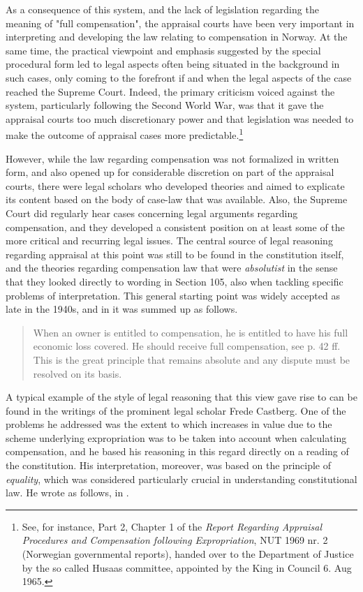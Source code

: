 \documentclass[10pt]{article} %
\begin{document}
As a consequence of this system, and the lack of legislation regarding the meaning of "full compensation", the appraisal courts have been very important in interpreting and developing the law relating to compensation in Norway. At the same time, the practical viewpoint and emphasis suggested by the special procedural form led to legal aspects often being situated in the background in such cases, only coming to the forefront if and when the legal aspects of the case reached the Supreme Court. Indeed, the primary criticism voiced against the system, particularly following the Second World War, was that it gave the appraisal courts too much discretionary power and that legislation was needed to make the outcome of appraisal cases more predictable.\footnote{See, for instance, Part 2, Chapter 1 of the \emph{Report Regarding Appraisal Procedures and Compensation following Expropriation}, NUT 1969 nr. 2 (Norwegian governmental reports), handed over to the Department of Justice by the so called Husaas committee, appointed by the King in Council 6. Aug 1965.}

However, while the law regarding compensation was not formalized in written form, and also opened up for considerable discretion on part of the appraisal courts, there were legal scholars who developed theories and aimed to explicate its content based on the body of case-law that was available. Also, the Supreme Court did regularly hear cases concerning legal arguments regarding compensation, and they developed a consistent position on at least some of the more critical and recurring legal issues. The central source of legal reasoning regarding appraisal at this point was still to be found in the constitution itself, and the theories regarding compensation law that were \emph{absolutist} in the sense that they looked directly to wording in Section 105, also when tackling specific problems of interpretation. This general starting point was widely accepted as late in the 1940s, and in \cite[p. 177]{schj} it was summed up as follows.

\begin{quote}
When an owner is entitled to compensation, he is entitled to have his full economic loss covered. He should receive full compensation, see p. 42 ff. This is the great principle that remains absolute and any dispute must be resolved on its basis.
\end{quote}

A typical example of the style of legal reasoning that this view gave rise to can be found in the writings of the prominent legal scholar Frede Castberg. One of the problems he addressed was the extent to which increases in value due to the scheme underlying expropriation was to be taken into account when calculating compensation, and he based his reasoning in this regard directly on a reading of the constitution. His interpretation, moreover, was based on the principle of \emph{equality}, which was considered particularly crucial in understanding constitutional law. He wrote as follows, in \cite[Volume 2, p. 268]{castberg}.
\end{document}

